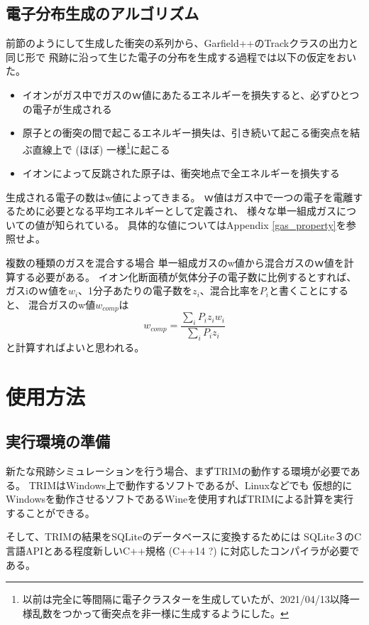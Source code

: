 \documentclass [11pt,a4paper,dvipdfmx] {jarticle}
\begin{document}
\subsection{電子分布生成のアルゴリズム}
前節のようにして生成した衝突の系列から、Garfield++のTrackクラスの出力と同じ形で
飛跡に沿って生じた電子の分布を生成する過程では以下の仮定をおいた。
\begin{itemize}
    \item イオンがガス中でガスのｗ値にあたるエネルギーを損失すると、必ずひとつの電子が生成される
    \item 原子との衝突の間で起こるエネルギー損失は、引き続いて起こる衝突点を結ぶ直線上で (ほぼ) 一様\footnote{以前は完全に等間隔に電子クラスターを生成していたが、2021/04/13以降一様乱数をつかって衝突点を非一様に生成するようにした。}に起こる
    \item イオンによって反跳された原子は、衝突地点で全エネルギーを損失する
\end{itemize}

生成される電子の数はw値によってきまる。
ｗ値はガス中で一つの電子を電離するために必要となる平均エネルギーとして定義され、
様々な単一組成ガスについての値が知られている。
具体的な値についてはAppendix \ref{gas_property}を参照せよ。

複数の種類のガスを混合する場合
単一組成ガスのw値から混合ガスのｗ値を計算する必要がある。
イオン化断面積が気体分子の電子数に比例するとすれば、
ガスiのｗ値を$w_i$、1分子あたりの電子数を$z_i$、混合比率を$P_i$と書くことにすると、
混合ガスのw値$w_{comp}$は
\begin{equation}
w_{comp} = \frac{\sum_{i}P_i z_i w_i}{\sum_{i}P_i z_i}
\end{equation}
と計算すればよいと思われる。


\section{使用方法}

\subsection{実行環境の準備}
新たな飛跡シミュレーションを行う場合、まずTRIMの動作する環境が必要である。
TRIMはWindows上で動作するソフトであるが、Linuxなどでも
仮想的にWindowsを動作させるソフトであるWineを使用すればTRIMによる計算を実行することができる。

そして、TRIMの結果をSQLiteのデータベースに変換するためには
SQLite３のC言語APIとある程度新しいC++規格 (C++14 ?) に対応したコンパイラが必要である。
\end{document}
